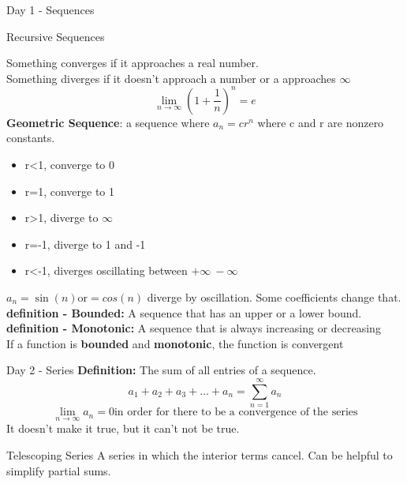 \documentclass[a4paper, 12pt]{article}
\begin{document}
\begin{section}{Day 1 - Sequences}
\begin{subsection}{Recursive Sequences}
	\end{subsection}
	Something converges if it approaches a real number.\\
	Something diverges if it doesn't approach a number or a approaches $\infty$
	\begin{equation} \label{Approaching e}
		\lim\limits_{n\to\infty}(1+\frac{1}{n})^{n}=e
	\end{equation}
\textbf{Geometric Sequence}: a sequence where $a_{n}=cr^{n}$ where c and r are nonzero constants.
\begin{itemize}
\item{r<1, converge to 0}
\item{r=1, converge to 1}
\item{r>1, diverge to $\infty$}
\item{r=-1, diverge to 1 and -1}
\item{r<-1, diverges oscillating between $+\infty~-\infty$}
\end{itemize}
$a_{n}=\sin(n) \mbox{or} =cos(n)$ diverge by oscillation. Some coefficients change that.
\textbf{definition - Bounded:} A sequence that has an upper or a lower bound.\\
\textbf{definition - Monotonic:} A sequence that is always increasing or decreasing\\
If a function is \textbf{bounded} and \textbf{monotonic}, the function is convergent

\end{section}
\begin{section}{Day 2 - Series}
\textbf{Definition:} The sum of all entries of a sequence. 
\begin{equation} \label{}
a_1+a_2+a_3+\dots+a_{n}=\sum_{n=1}^{\infty}a_{n}
\end{equation}
\begin{equation} 
\lim\limits_{n\to\infty}a_{n}=0 \mbox{in order for there to be a convergence of the
series}
\end{equation}
It doesn't make it true, but it can't not be true.

\begin{subsection}{Telescoping Series}
A series in which the interior terms cancel. Can be helpful to simplify partial sums.\\
\end{subsection}

\end{section}
\end{document}
